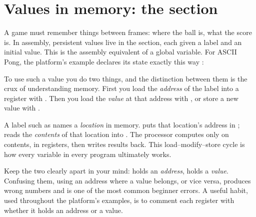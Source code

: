 \section{Values in memory: the  section}

A game must remember things between frames: where the ball is, what the score
is. In assembly, persistent values live in the  section, each given a
label and an initial value. This is the assembly equivalent of a global variable.
For ASCII Pong, the platform's example declares its state exactly this way
\citep{prg32repo}:



To use such a value you do two things, and the distinction between them is the
crux of understanding memory. First you load the \emph{address} of the label into
a register with . Then you load the \emph{value} at that address with
, or store a new value with .



\begin{prgconcept}
A label such as  names a \emph{location} in memory.  puts that location's address in ;  reads the
\emph{contents} of that location into . The processor computes only on
contents, in registers, then writes results back. This load--modify--store cycle
is how every variable in every program ultimately works.
\end{prgconcept}

\begin{prgwarn}
Keep the two clearly apart in your mind:  holds an \emph{address}, 
holds a \emph{value}. Confusing them, using an address where a value belongs, or
vice versa, produces wrong numbers and is one of the most common beginner errors.
A useful habit, used throughout the platform's examples, is to comment each
register with whether it holds an address or a value.
\end{prgwarn}

